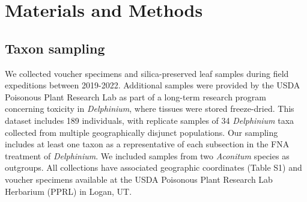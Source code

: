 \documentclass[11pt]{article}
\begin{document}
\section{Materials and Methods}

\subsection{Taxon sampling}
We collected voucher specimens and silica-preserved leaf samples during field expeditions
between 2019-2022. Additional samples were provided by the USDA Poisonous Plant Research
Lab as part of a long-term research program concerning toxicity in \emph{Delphinium}, where
tissues were stored freeze-dried.
% 
This dataset includes 189 individuals, with replicate samples of 34 \emph{Delphinium} 
taxa collected from multiple geographically disjunct populations. Our sampling includes
at least one taxon as a representative of each subsection in the FNA treatment of
\emph{Delphinium}. 
We included samples from two \emph{Aconitum} species as outgroups.
All collections have associated geographic coordinates (Table S1) and voucher 
specimens available at the USDA Poisonous Plant Research Lab Herbarium (PPRL)
in Logan, UT.
\end{document}
